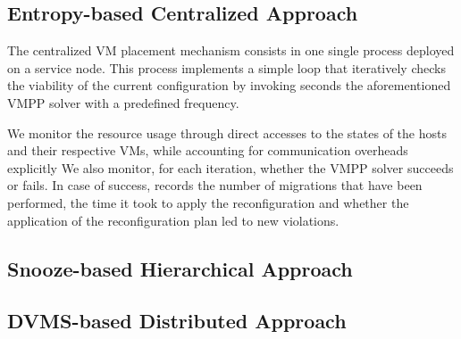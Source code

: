 \subsection{Entropy-based Centralized Approach}
\label{subsec:entropy}
The centralized VM placement mechanism consists in one single \sg
process deployed on a service node. This process implements a simple loop that
iteratively checks the viability of the current configuration by
invoking seconds the aforementioned VMPP solver with a predefined
frequency.


We monitor the resource usage through direct accesses 
to the states of the hosts and their respective VMs, while accounting
for communication overheads explicitly
%
%
We also monitor, for each iteration, whether the VMPP solver succeeds
or fails. In case of success, \vmps records the number of migrations
that have been performed, the time it took to apply the
reconfiguration and whether the application of the reconfiguration
plan led to new violations.

\subsection{Snooze-based Hierarchical Approach}
\label{subsec:snooze}


\subsection{DVMS-based Distributed Approach}
\label{subsec:dvms}




